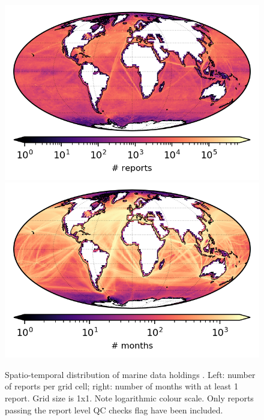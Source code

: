 \begin{figure}[h]
\includegraphics{resources/header-reports-map-optimal.png}
\includegraphics{resources/header-months-map-optimal.png}
\caption{Spatio-temporal distribution of marine data holdings \datatimerange{}. Left: number of reports per grid cell; right: number of months with at least 1 report. Grid size is 1x1. Note logarithmic colour scale. Only reports passing the report level QC checks flag have been included.\\}
\label{fig:nreports-map1}
\end{figure}

\newpage

